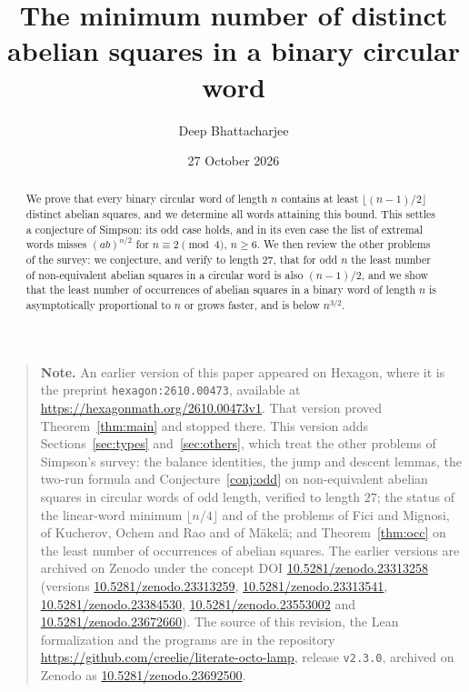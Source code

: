 \documentclass[11pt,reqno]{amsart}
\title[Abelian squares in binary circular words]{The minimum number of distinct abelian squares in a binary circular word}
\author{Deep Bhattacharjee}
\date{27 October 2026}
\theoremstyle{definition}
\newcommand{\fl}[1]{\lfloor #1\rfloor}
\begin{document}
\begin{abstract}
We prove that every binary circular word of length $n$ contains at least $\fl{(n-1)/2}$ distinct abelian squares, and we determine all words attaining this bound. This settles a conjecture of Simpson: its odd case holds, and in its even case the list of extremal words misses $(ab)^{n/2}$ for $n\equiv 2\pmod 4$, $n\ge 6$. We then review the other problems of the survey: we conjecture, and verify to length $27$, that for odd $n$ the least number of non-equivalent abelian squares in a circular word is also $(n-1)/2$, and we show that the least number of occurrences of abelian squares in a binary word of length $n$ is asymptotically proportional to $n$ or grows faster, and is below $n^{3/2}$.
\end{abstract}
\maketitle

\begin{quote}
\small\sloppy
\noindent\textbf{Note.} An earlier version of this paper appeared on Hexagon, where it is the preprint \texttt{hexagon:2610.00473}, available at \url{https://hexagonmath.org/2610.00473v1}. That version proved Theorem~\ref{thm:main} and stopped there. This version adds Sections~\ref{sec:types} and~\ref{sec:others}, which treat the other problems of Simpson's survey: the balance identities, the jump and descent lemmas, the two-run formula and Conjecture~\ref{conj:odd} on non-equivalent abelian squares in circular words of odd length, verified to length $27$; the status of the linear-word minimum $\fl{n/4}$ and of the problems of Fici and Mignosi, of Kucherov, Ochem and Rao and of M\"akel\"a; and Theorem~\ref{thm:occ} on the least number of occurrences of abelian squares. The earlier versions are archived on Zenodo under the concept DOI \href{https://doi.org/10.5281/zenodo.23313258}{10.5281/zenodo.23313258} (versions \href{https://doi.org/10.5281/zenodo.23313259}{10.5281/zenodo.23313259}, \href{https://doi.org/10.5281/zenodo.23313541}{10.5281/zenodo.23313541}, \href{https://doi.org/10.5281/zenodo.23384530}{10.5281/zenodo.23384530}, \href{https://doi.org/10.5281/zenodo.23553002}{10.5281/zenodo.23553002} and \href{https://doi.org/10.5281/zenodo.23672660}{10.5281/zenodo.23672660}). The source of this revision, the Lean formalization and the programs are in the repository \url{https://github.com/creelie/literate-octo-lamp}, release \texttt{v2.3.0}, archived on Zenodo as \href{https://doi.org/10.5281/zenodo.23692500}{10.5281/zenodo.23692500}.
\end{quote}
\end{document}
